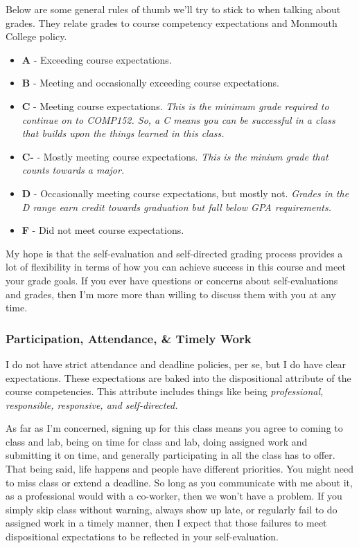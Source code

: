 \documentclass[10pt]{article}
\begin{document}
Below are some general rules of thumb we'll try to stick to when talking about grades. They relate grades to
course competency expectations and Monmouth College policy.
\begin{itemize}
  \item \textbf{A} - Exceeding course expectations.
  \item \textbf{B} - Meeting and occasionally exceeding course expectations.
  \item \textbf{C} - Meeting course expectations. \textit{This is the minimum grade required to continue on to COMP152. So, a C means you can be successful in a class that builds upon the things learned in this class.}
  \item \textbf{C-} - Mostly meeting course expectations. \textit{This is the minium grade that counts towards a major.}
  \item \textbf{D} - Occasionally meeting course expectations, but mostly not. \textit{Grades in the D range earn credit towards graduation but fall below GPA requirements.}
  \item \textbf{F} - Did not meet course expectations.
\end{itemize}

My hope is that the self-evaluation and self-directed grading process provides a lot of flexibility in terms
of how you can achieve success in this course and meet your grade goals. If you ever have questions or concerns
about self-evaluations and grades, then I'm more more than willing to discuss them with you at any time.

\subsubsection{Participation, Attendance, \& Timely Work}

I do not have strict attendance and deadline policies, per se, but I do have clear expectations. These
expectations are baked into the dispositional attribute of the course competencies. This attribute
includes things like being \textit{professional, responsible, responsive, and self-directed.}

As far as I'm concerned, signing up for this class means you agree to coming to class and lab,
being on time for class and lab, doing assigned work and submitting it on time, and generally participating
in all the class has to offer.  That being said, life happens and people have different priorities.
You might need to miss class or extend a deadline.  So long as you communicate with me about it, as a
professional would with a co-worker, then we won't have a problem. If you simply skip class without
warning, always show up late, or regularly fail to do assigned work in a timely manner, then I expect that
those failures to meet dispositional expectations to be reflected in your self-evaluation.
\end{document}
